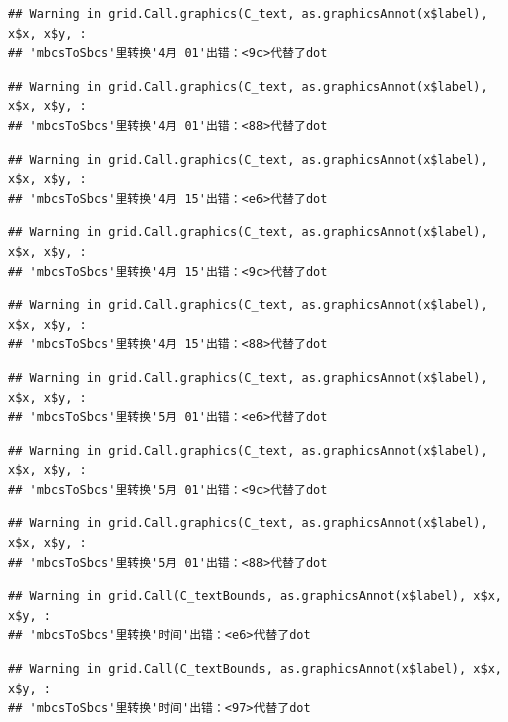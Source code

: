 \documentclass[
]{article}
\begin{document}
\begin{verbatim}
## Warning in grid.Call.graphics(C_text, as.graphicsAnnot(x$label), x$x, x$y, :
## 'mbcsToSbcs'里转换'4月 01'出错：<9c>代替了dot
\end{verbatim}

\begin{verbatim}
## Warning in grid.Call.graphics(C_text, as.graphicsAnnot(x$label), x$x, x$y, :
## 'mbcsToSbcs'里转换'4月 01'出错：<88>代替了dot
\end{verbatim}

\begin{verbatim}
## Warning in grid.Call.graphics(C_text, as.graphicsAnnot(x$label), x$x, x$y, :
## 'mbcsToSbcs'里转换'4月 15'出错：<e6>代替了dot
\end{verbatim}

\begin{verbatim}
## Warning in grid.Call.graphics(C_text, as.graphicsAnnot(x$label), x$x, x$y, :
## 'mbcsToSbcs'里转换'4月 15'出错：<9c>代替了dot
\end{verbatim}

\begin{verbatim}
## Warning in grid.Call.graphics(C_text, as.graphicsAnnot(x$label), x$x, x$y, :
## 'mbcsToSbcs'里转换'4月 15'出错：<88>代替了dot
\end{verbatim}

\begin{verbatim}
## Warning in grid.Call.graphics(C_text, as.graphicsAnnot(x$label), x$x, x$y, :
## 'mbcsToSbcs'里转换'5月 01'出错：<e6>代替了dot
\end{verbatim}

\begin{verbatim}
## Warning in grid.Call.graphics(C_text, as.graphicsAnnot(x$label), x$x, x$y, :
## 'mbcsToSbcs'里转换'5月 01'出错：<9c>代替了dot
\end{verbatim}

\begin{verbatim}
## Warning in grid.Call.graphics(C_text, as.graphicsAnnot(x$label), x$x, x$y, :
## 'mbcsToSbcs'里转换'5月 01'出错：<88>代替了dot
\end{verbatim}

\begin{verbatim}
## Warning in grid.Call(C_textBounds, as.graphicsAnnot(x$label), x$x, x$y, :
## 'mbcsToSbcs'里转换'时间'出错：<e6>代替了dot
\end{verbatim}

\begin{verbatim}
## Warning in grid.Call(C_textBounds, as.graphicsAnnot(x$label), x$x, x$y, :
## 'mbcsToSbcs'里转换'时间'出错：<97>代替了dot
\end{verbatim}
\end{document}

